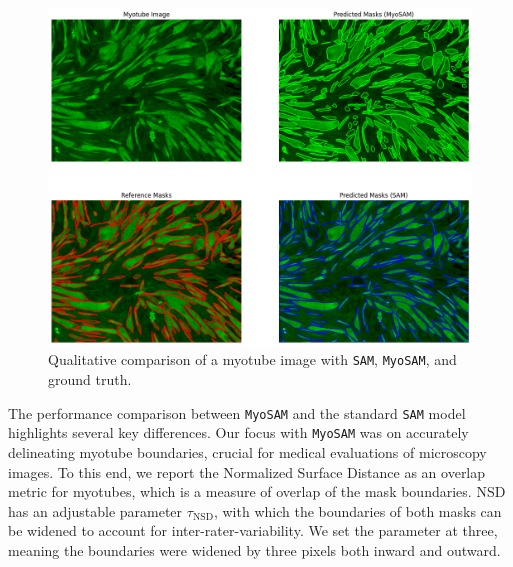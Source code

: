 \begin{figure}
	\centering
	\includegraphics[width=\textwidth]{"images/qualitative_performance_myosam.png"}
	\caption[Qualitative performance \texttt{MyoSAM}]{Qualitative comparison of a myotube image with \texttt{SAM}, \texttt{MyoSAM}, and ground truth.}
	\label{figperfsamqual}
\end{figure} 
The performance comparison between \texttt{MyoSAM} and the standard \texttt{SAM} model highlights several key differences. Our focus with \texttt{MyoSAM} was on accurately delineating myotube boundaries, crucial for medical evaluations of microscopy images. To this end, we report the Normalized Surface Distance as an overlap metric for myotubes, which is a measure of overlap of the mask boundaries. NSD has an adjustable parameter $\tau_{\text{NSD}}$, with which the boundaries of both masks can be widened to account for inter-rater-variability. We set the parameter at three, meaning the boundaries were widened by three pixels both inward and outward.
